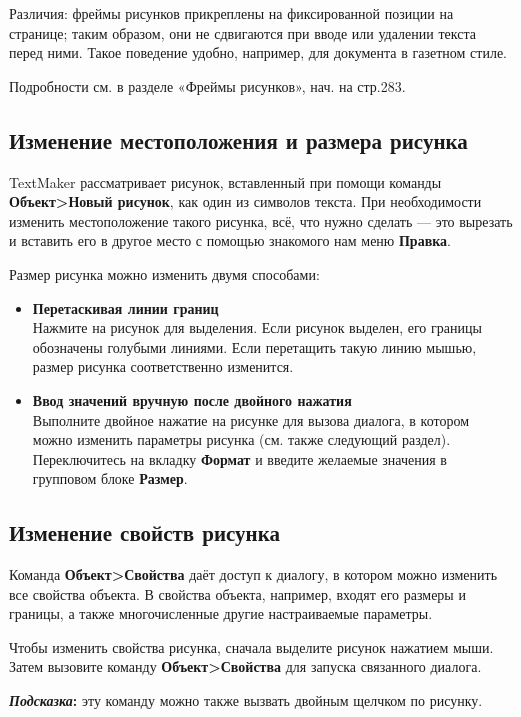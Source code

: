 ﻿\documentclass[a4paper,10pt]{article}
\begin{document}
Различия: фреймы рисунков прикреплены на фиксированной позиции на странице; таким образом, они не сдвигаются при вводе или удалении текста перед ними. Такое поведение удобно, например, для документа в газетном стиле.

Подробности см. в разделе «Фреймы рисунков», нач. на стр.283.

\subsection{Изменение местоположения и размера рисунка}
TextMaker рассматривает рисунок, вставленный при помощи команды \textbf{Объект>Новый рисунок}, как один из символов текста. При необходимости изменить местоположение такого рисунка, всё, что нужно сделать — это вырезать и вставить его в другое место с помощью знакомого нам меню \textbf{Правка}.

Размер рисунка можно изменить двумя способами:

\begin{itemize}
 \item \textbf{Перетаскивая линии границ}\\
 Нажмите на рисунок для выделения. Если рисунок выделен, его границы обозначены голубыми линиями. Если перетащить такую линию мышью, размер рисунка соответственно изменится.
 \item \textbf{Ввод значений вручную после двойного нажатия}\\
 Выполните двойное нажатие на рисунке для вызова диалога, в котором можно изменить параметры рисунка (см. также следующий раздел). Переключитесь на вкладку \textbf{Формат} и введите желаемые значения в групповом блоке \textbf{Размер}.
\end{itemize}

\subsection{Изменение свойств рисунка}
Команда \textbf{Объект>Свойства} даёт доступ к диалогу, в котором можно изменить все свойства объекта. В свойства объекта, например, входят его размеры и границы, а также многочисленные другие настраиваемые параметры.

Чтобы изменить свойства рисунка, сначала выделите рисунок нажатием мыши. Затем вызовите команду \textbf{Объект>Свойства} для запуска связанного диалога.

\begin{mdframed}[backgroundcolor=blue!10]
\textbf{\textit{Подсказка}:} эту команду можно также вызвать двойным щелчком по рисунку.
\end{mdframed}
\end{document}
